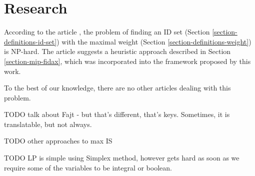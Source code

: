 \chapter{Research}

According to the article \cite[Chapter~4]{fidax}, the problem of finding an ID set (Section \ref{section-definitions-id-set}) with the maximal weight (Section \ref{section-definitions-weight}) is NP-hard. The article suggests a heuristic approach described in Section \ref{section-mip-fidax}, which was incorporated into the framework proposed by this work.

To the best of our knowledge, there are no other articles dealing with this problem.

TODO talk about Fajt \cite{fajt} - but that's different, that's keys. Sometimes, it is translatable, but not always.

TODO other approaches to max IS

TODO LP is simple using Simplex method, however gets hard as soon as we require some of the variables to be integral or boolean.